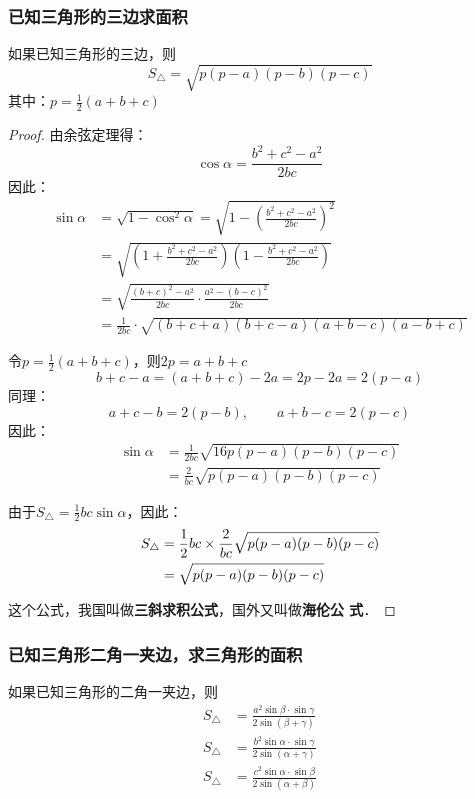 \subsubsection{已知三角形的三边求面积}

如果已知三角形的三边，则
\[S_{\triangle}=\sqrt{p(p-a)(p-b)(p-c)} \]
其中：$p=\frac{1}{2}(a+b+c)$

\begin{proof}
    由余弦定理得：
\[\cos\alpha=\frac{b^2+c^2-a^2}{2bc}\]
因此：
\[\begin{split}
    \sin\alpha&=\sqrt{1-\cos^2\alpha}=\sqrt{1-\left(\frac{b^2+c^2-a^2}{2bc}\right)^2}\\
    &=\sqrt{\left(1+\frac{b^2+c^2-a^2}{2bc}\right)\left(1-\frac{b^2+c^2-a^2}{2bc}\right)}\\
    &=\sqrt{\frac{(b+c)^2-a^2}{2bc}\cdot \frac{a^2-(b-c)^2}{2bc}}\\
    &=\frac{1}{2bc}\cdot \sqrt{(b+c+a)(b+c-a)(a+b-c)(a-b+c)}
\end{split}\]

令$p=\frac{1}{2}(a+b+c)$，则$2p=a+b+c$
\[b+c-a=(a+b+c)-2a=2p-2a=2(p-a)\]
同理：
\[a+c-b=2(p-b),\qquad a+b-c=2(p-c)\]
因此：
\[\begin{split}
\sin\alpha&=\frac{1}{2bc}\sqrt{16p(p-a)(p-b)(p-c)}\\
&=\frac{2}{bc}\sqrt{p(p-a)(p-b)(p-c)}
\end{split}\]

由于$S_{\triangle}=\frac{1}{2}bc\sin\alpha$，因此：
\[\begin{split}
    S_{\triangle}&=\dfrac{1}{2}bc\times \dfrac{2}{bc}\sqrt{p(p-a)(p-b)(p-c)}\\
    &=\sqrt{p(p-a)(p-b)(p-c)}
\end{split}\]

这个公式，我国叫做\textbf{三斜求积公式}，国外又叫做\textbf{海伦公
式}．
\end{proof}

\subsubsection{已知三角形二角一夹边，求三角形的面积}

如果已知三角形的二角一夹边，则
\[\begin{split}
S_{\triangle}&=\frac{a^{2} \sin \beta \cdot \sin \gamma}{2 \sin (\beta+\gamma)} \\
S_{\triangle}&=\frac{b^{2} \sin \alpha \cdot \sin \gamma}{2 \sin (\alpha+\gamma)} \\
S_{\triangle}&=\frac{c^{2} \sin \alpha \cdot \sin \beta}{2 \sin (\alpha+\beta)}
    \end{split}\]

